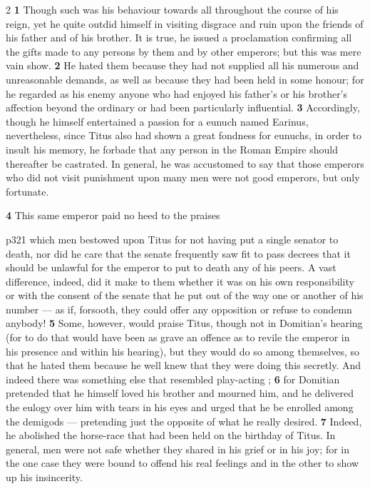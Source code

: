 2 \textbf{1} Though such was his behaviour towards all throughout the course of his reign, yet he quite outdid himself in visiting disgrace and ruin upon the friends of his father and of his brother. It is true, he issued a proclamation confirming all the gifts made to any persons by them and by other emperors; but this was mere vain show. \textbf{2} He hated them because they had not supplied all his numerous and unreasonable demands, as well as because they had been held in some honour; for he regarded as his enemy anyone who had enjoyed his father's or his brother's affection beyond the ordinary or had been particularly influential. \textbf{3} Accordingly, though he himself entertained a passion for a eunuch named Earinus, nevertheless, since Titus also had shown a great fondness for eunuchs, in order to insult his memory, he forbade that any person in the Roman Empire should thereafter be castrated. In general, he was accustomed to say that those emperors who did not visit punishment upon many men were not good emperors, but only fortunate.

\textbf{4} This same emperor paid no heed to the praises

p321 which men bestowed upon Titus for not having put a single senator to death, nor did he care that the senate frequently saw fit to pass decrees that it should be unlawful for the emperor to put to death any of his peers. A vast difference, indeed, did it make to them whether it was on his own responsibility or with the consent of the senate that he put out of the way one or another of his number \texthebrew{—} as if, forsooth, they could offer any opposition or refuse to condemn anybody! \textbf{5} Some, however, would praise Titus, though not in Domitian's hearing (for to do that would have been as grave an offence as to revile the emperor in his presence and within his hearing), but they would do so among themselves, so that he hated them because he well knew that they were doing this secretly. And indeed there was something else that resembled play-acting ; \textbf{6} for Domitian pretended that he himself loved his brother and mourned him, and he delivered the eulogy over him with tears in his eyes and urged that he be enrolled among the demigods \texthebrew{—} pretending just the opposite of what he really desired. \textbf{7} Indeed, he abolished the horse-race that had been held on the birthday of Titus. In general, men were not safe whether they shared in his grief or in his joy; for in the one case they were bound to offend his real feelings and in the other to show up his insincerity.

